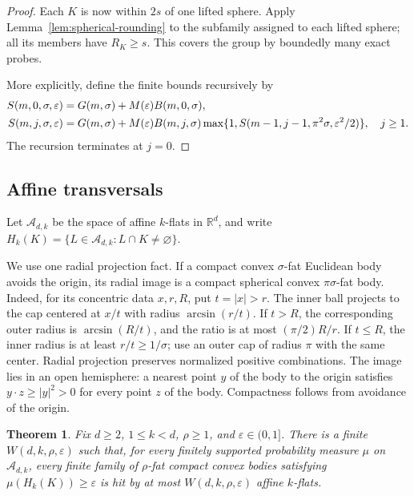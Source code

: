 \documentclass[11pt]{article}
\newtheorem{theorem}{Theorem}[section]
\theoremstyle{remark}
\newcommand{\R}{\mathbb R}
\newcommand{\eps}{\varepsilon}
\newcommand{\A}{\mathcal A}
\begin{document}
\begin{proof}
Each \(K\) is now within \(2s\) of one lifted sphere.
Apply Lemma~\ref{lem:spherical-rounding} to the subfamily assigned
to each lifted sphere; all its members have \(R_K\geq s\).
This covers the group by boundedly many exact probes.

More explicitly, define the finite bounds recursively by
\begin{align}
 S(m,0,\sigma,\eps)
 &=G(m,\sigma)+M(\eps)B(m,0,\sigma),\notag\\
 S(m,j,\sigma,\eps)
 &=G(m,\sigma)+M(\eps)B(m,j,\sigma)
 \max\{1,S(m-1,j-1,\pi^2\sigma,\eps^2/2)\},
 \quad j\geq1.
 \label{eq:S}
\end{align}
The recursion terminates at \(j=0\).
\end{proof}

\subsection{Affine transversals}

Let \(\A_{d,k}\) be the space of affine \(k\)-flats in \(\R^d\), and
write \(H_k(K)=\{L\in\A_{d,k}:L\cap K\ne\varnothing\}\).

We use one radial projection fact.
If a compact convex \(\sigma\)-fat Euclidean body avoids the origin,
its radial image is a compact spherical convex
\(\pi\sigma\)-fat body.
Indeed, for its concentric data \(x,r,R\), put \(t=|x|>r\).
The inner ball projects to the cap centered at \(x/t\) with radius
\(\arcsin(r/t)\).
If \(t>R\), the corresponding outer radius is \(\arcsin(R/t)\),
and the ratio is at most \((\pi/2)R/r\).
If \(t\leq R\), the inner radius is at least \(r/t\geq1/\sigma\);
use an outer cap of radius \(\pi\) with the same center.
Radial projection preserves normalized positive combinations.
The image lies in an open hemisphere: a nearest point \(y\) of the
body to the origin satisfies \(y\cdot z\geq|y|^2>0\) for every
point \(z\) of the body.
Compactness follows from avoidance of the origin.

\begin{theorem}
\label{thm:affine-net}
Fix \(d\geq2\), \(1\leq k<d\), \(\rho\geq1\), and \(\eps\in(0,1]\).
There is a finite \(W(d,k,\rho,\eps)\) such that, for every finitely
supported probability measure \(\mu\) on \(\A_{d,k}\), every finite
family of \(\rho\)-fat compact convex bodies satisfying
\(\mu(H_k(K))\geq\eps\) is hit by at most \(W(d,k,\rho,\eps)\)
affine \(k\)-flats.
\end{theorem}
\end{document}
